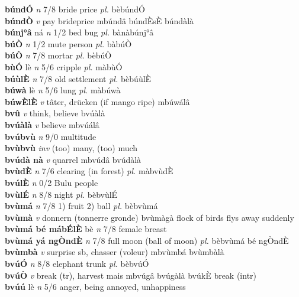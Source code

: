 \documentclass{article}
\begin{document}
{\bf búndÓ}  {\it n} 7/8 bride price {\it pl.} bèbúndÓ         \\ 
{\bf búndÒ}  {\it v} pay brideprice   mbúndâ  búndÈsÈ búndàlà   \\ 
{\bf búnj°â} ná {\it n} 1/2 bed bug {\it pl.} bànàbúnj°â         \\ 
{\bf búÒ}  {\it n} 1/2 mute person {\it pl.} bàbúÒ         \\ 
{\bf búÒ}  {\it n} 7/8 mortar {\it pl.} bèbúÒ         \\ 
{\bf bùÓ} lè {\it n} 5/6 cripple {\it pl.} màbùÓ         \\ 
{\bf búùlÈ}  {\it n} 7/8 old settlement {\it pl.} bèbúùlÈ         \\ 
{\bf búwà} lè {\it n} 5/6 lung {\it pl.} màbúwà         \\ 
{\bf búwÈlÈ}  {\it v} tâter, drücken (if mango ripe)   mbúwálâ      \\ 
{\bf bvû}  {\it v} think, believe      bvúàlà   \\ 
{\bf bvúàlà}  {\it v} believe   mbvúálâ      \\ 
{\bf bvúbvù}  {\it n} 9/0 multitude         \\ 
{\bf bvùbvù}  {\it inv} (too) many, (too) much         \\ 
{\bf bvúdà nà}  {\it v} quarrel   mbvúdâ   bvúdàlà   \\ 
{\bf bvùdÈ}  {\it n} 7/6 clearing (in forest) {\it pl.} màbvùdÈ         \\ 
{\bf bvúlÈ}  {\it n} 0/2 Bulu people         \\ 
{\bf bvùlÉ}  {\it n} 8/8 night {\it pl.} bèbvùlÉ         \\ 
{\bf bvùmá}  {\it n} 7/8 1) fruit 2) ball {\it pl.} bèbvùmá         \\ 
{\bf bvùmà}  {\it v} donnern (tonnerre gronde)       bvùmàgà flock of birds flys away suddenly  \\ 
{\bf bvùmá bé mábÉlÈ} bè {\it n} 7/8 female breast         \\ 
{\bf bvùmá yá ngÒndÈ}  {\it n} 7/8 full moon (ball of moon) {\it pl.} bèbvùmá bé ngÒndÈ         \\ 
{\bf bvùmbà}  {\it v} surprise sb, chasser (voleur)   mbvùmbá   bvùmbàlà   \\ 
{\bf bvúÓ}  {\it n} 8/8 elephant trunk {\it pl.} bèbvúÓ         \\ 
{\bf bvúÒ}  {\it v} break (tr), harvest mais   mbvúgâ   bvúgàlà  bvúkÈ break (intr) \\ 
{\bf bvúú} lè {\it n} 5/6 anger, being annoyed, unhappiness         \\ 
\end{document}
